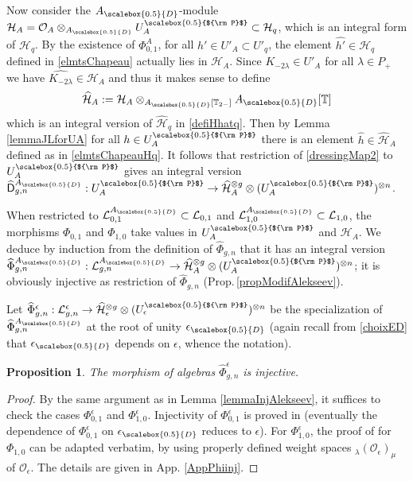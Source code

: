 \documentclass[11pt]{amsart}
\newtheorem{prop}[teo]{Proposition}
\newcommand{\e}{\epsilon}
\newcommand{\Oo}{\mathcal{O}}
\newcommand{\eD}{\epsilon_{\scalebox{0.5}{D}}}
\newcommand{\AD}{A_{\scalebox{0.5}{D}}}
\newcommand{\Pup}{{\scalebox{0.5}{${\rm P}$}}}
\begin{document}
\indent Now consider the $\AD$-module $\mathcal{H}_A = \mathcal{O}_A \otimes_{\AD} U_A^\Pup \subset \mathcal{H}_q$, which is an integral form of $\mathcal{H}_q$. By the existence of $\Phi_{0,1}^A$, for all $h' \in U'_A \subset U'_q$, the element $\widehat{h'} \in \mathcal{H}_q$ defined in \eqref{elmtsChapeau} actually lies in $\mathcal{H}_A$. Since $K_{-2\lambda} \in U'_A$ for all $\lambda \in P_+$ \cite[Prop.\,2.24]{BR2} we have $\widehat{K_{-2\lambda}} \in \mathcal{H}_A$ and thus it makes sense to define $$\widehat{\mathcal{H}}_A := \mathcal{H}_A \otimes_{\AD[\mathbb{T}_{2-}]} \AD[\mathbb{T}]$$ which is an integral version of $\widehat{\mathcal{H}}_q$ in \eqref{defiHhatq}. Then by Lemma \ref{lemmaJLforUA} for all $h \in U_A^\Pup$ there is an element $\widehat{h} \in \widehat{\mathcal{H}}_A$ defined as in \eqref{elmtsChapeauHq}. It follows that restriction of \eqref{dressingMap2} to $U_A^\Pup$ gives an integral version $\widehat{\mathsf{D}}_{g,n}^{\AD} : U_A^\Pup \to \widehat{\mathcal{H}}_A^{\otimes g} \otimes (U_A^\Pup)^{\otimes n}$.

\indent When restricted to $\mathcal{L}_{0,1}^{\AD} \subset \mathcal{L}_{0,1}$ and $\mathcal{L}_{1,0}^{\AD} \subset \mathcal{L}_{1,0}$, the morphisms $\Phi_{0,1}$ and $\Phi_{1,0}$ take values in $U_A^\Pup$ and $\mathcal{H}_A$. We deduce by induction from the definition of $\widehat{\Phi}_{g,n}$ that it has an integral version $\widehat{\Phi}_{g,n}^{\AD} : \mathcal{L}_{g,n}^{\AD} \to \widehat{\mathcal{H}}_A^{\otimes g} \otimes (U_A^\Pup)^{\otimes n}$; it is obviously injective as restriction of $\widehat{\Phi}_{g,n}$ (Prop.\,\ref{propModifAlekseev}).

\smallskip

\indent Let $\widehat{\Phi}_{g,n}^{\e} :  \mathcal{L}_{g,n}^{\e} \to \widehat{\mathcal{H}}_{\e}^{\otimes g} \otimes (U_\e^\Pup)^{\otimes n}$ be the specialization of $\widehat{\Phi}_{g,n}^{\AD}$ at the root of unity $\eD$ (again recall from \eqref{choixED} that $\eD$ depends on $\e$, whence the notation).

\begin{prop}\label{AlekseevInjRootOf1}
The morphism of algebras $\widehat{\Phi}_{g,n}^{\e}$ is injective.
\end{prop}
\begin{proof}
By the same argument as in Lemma \ref{lemmaInjAlekseev}, it suffices to check the cases $\Phi_{0,1}^{\e}$ and $\Phi_{1,0}^{\e}$. Injectivity of $\Phi_{0,1}^{\e}$ is proved in \cite[Cor.\,2.25]{BR2} (eventually the dependence of $\Phi_{0,1}^{\e}$ on $\eD$ reduces to $\e$). For $\Phi_{1,0}^{\e}$, the proof of \cite[Th.\,3.13]{BFR} for $\Phi_{1,0}$ can be adapted verbatim, by using properly defined weight spaces $_\lambda(\mathcal{O}_\e)_\mu$ of $\Oo_\e$. The details are given in App. \ref{AppPhiinj}.
\end{proof}
\end{document}

